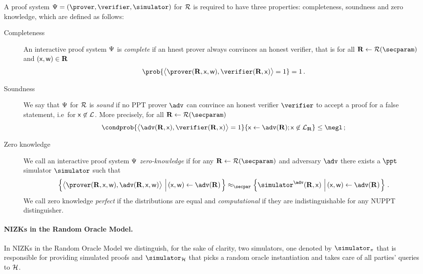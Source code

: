 \documentclass[runningheads,11pt]{llncs}
\theoremstyle{definition}
\begin{document}
A proof system $\proofsystem = (\prover, \verifier, \simulator)$ for $\mathcal{R}$ is required to have three properties: completeness, soundness and zero knowledge, which are defined as follows:
\begin{description}
	\item[Completeness] An interactive proof system $\mathrm{\Psi}$ is \emph{complete} if an hnest prover always convinces an honest verifier, that is for all $\REL \gets \RELGEN(\secparam)$ and $(\mathsf{x}, \mathsf{w}) \in \mathbf{R}$
	\[
		\prob{\ip{\prover (\REL, \inp, \wit)}{\verifier (\REL, \inp)} = 1} = 1\,.
	\]
	\item[Soundness] We say that $\mathrm{\Psi}$ for $\mathcal{R}$ is \emph{sound} if no PPT prover $\adv$ can convince an honest verifier $\verifier$ to accept a proof for a false statement, i.e~for $\mathsf{x} \not\in\mathcal{L}$. More precisely, for all $\REL \gets \RELGEN(\secparam)$
	\[
		\condprob{\ip{\adv(\REL, \inp)}{\verifier(\REL, \inp)} = 1}{\inp \gets \adv(\REL); \inp \not\in \LANG_\REL} \leq \negl\,;
	\]
	\item[Zero knowledge] We call an interactive proof system $\mathrm{\Psi}$ \emph{zero-knowledge} if for any $\REL \gets \RELGEN(\secparam)$ and adversary $\adv$ there exists a $\ppt$ simulator $\simulator$ such that
	\begin{multline*}
	  \left\{\ip{\prover(\REL, \inp, \wit)}{\adv(\REL, \inp, \wit)} \,\left|\, (\inp, \wit) \gets \adv(\REL)\vphantom{\simulator^\adv}\right.\right\} \approx_\secpar
		\left\{\simulator^{\adv}(\REL, \inp)\,\left|\, (\inp, \wit) \gets \adv(\REL)\vphantom{\simulator^\adv}\right.\right\}\,.
	\end{multline*}
	We call zero knowledge \emph{perfect} if the distributions are equal and \emph{computational} if they are indistinguishable for any NUPPT distinguisher.
\end{description}

\paragraph{NIZKs in the Random Oracle Model.}
In NIZKs in the Random Oracle Model we distinguish, for the sake of clarity, two simulators, one denoted by $\simulator_\zkproof$ that is responsible for providing simulated proofs and $\simulator_\ro$ that picks a random oracle instantiation and takes care of all parties' queries to $\mathcal{H}$.
\end{document}
